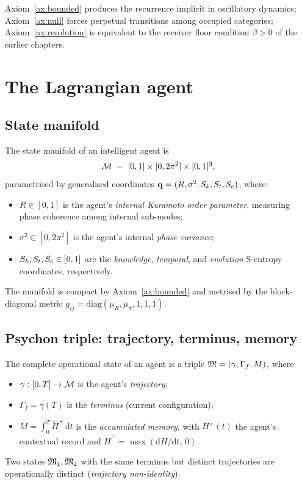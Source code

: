 Axiom~\ref{ax:bounded} produces the recurrence implicit in oscillatory
dynamics; Axiom~\ref{ax:null} forces perpetual transitions among occupied
categories; Axiom~\ref{ax:resolution} is equivalent to the receiver floor
condition $\beta>0$ of the earlier chapters.

\section{The Lagrangian agent}
\label{sec:ch04-agent}

\subsection{State manifold}

\begin{definition}\label{def:ch04-mfld}
The state manifold of an intelligent agent is
\[
\mathcal{M} \;=\; [0,1]\times[0,2\pi^2]\times[0,1]^3,
\]
parametrised by generalised coordinates
$\mathbf{q}=(R,\sigma^2,S_k,S_t,S_e)$, where:
\begin{itemize}[leftmargin=*]
\item $R\in[0,1]$ is the agent's \emph{internal Kuramoto order parameter},
  measuring phase coherence among internal sub-modes;
\item $\sigma^2\in[0,2\pi^2]$ is the agent's internal \emph{phase variance};
\item $S_k,S_t,S_e\in[0,1]$ are the \emph{knowledge}, \emph{temporal}, and
  \emph{evolution} S-entropy coordinates, respectively.
\end{itemize}
The manifold is compact by Axiom~\ref{ax:bounded} and metrised by the
block-diagonal metric
$g_{ij}=\mathrm{diag}(\mu_R,\mu_\sigma,1,1,1)$.
\end{definition}

\subsection{Psychon triple: trajectory, terminus, memory}

\begin{definition}\label{def:psychon}
The complete operational state of an agent is a triple
$\mathfrak{M}=(\gamma,\Gamma_f,M)$, where
\begin{itemize}[leftmargin=*]
\item $\gamma:[0,T]\to\mathcal{M}$ is the agent's \emph{trajectory};
\item $\Gamma_f=\gamma(T)$ is the \emph{terminus} (current configuration);
\item $M=\int_0^T\dot{H}^+\,\mathrm{d}t$ is the \emph{accumulated memory},
  with $H^+(t)$ the agent's contextual record and
  $\dot{H}^+=\max(\mathrm{d}H/\mathrm{d}t,\,0)$.
\end{itemize}
Two states $\mathfrak{M}_1,\mathfrak{M}_2$ with the same terminus but distinct trajectories
are operationally distinct (\emph{trajectory non-identity}).
\end{definition}

